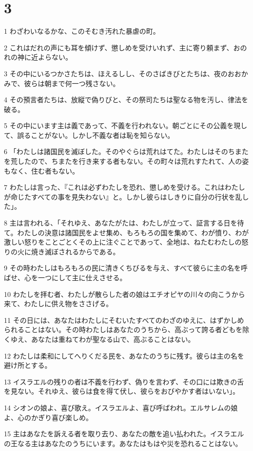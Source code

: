\chapter{3}

\par 1 わざわいなるかな、このそむき汚れた暴虐の町。
\par 2 これはだれの声にも耳を傾けず、懲しめを受けいれず、主に寄り頼まず、おのれの神に近よらない。
\par 3 その中にいるつかさたちは、ほえるしし、そのさばきびとたちは、夜のおおかみで、彼らは朝まで何一つ残さない。
\par 4 その預言者たちは、放縦で偽りびと、その祭司たちは聖なる物を汚し、律法を破る。
\par 5 その中にいます主は義であって、不義を行われない。朝ごとにその公義を現して、誤ることがない。しかし不義な者は恥を知らない。
\par 6 「わたしは諸国民を滅ぼした。そのやぐらは荒れはてた。わたしはそのちまたを荒したので、ちまたを行き来する者もない。その町々は荒れすたれて、人の姿もなく、住む者もない。
\par 7 わたしは言った、『これは必ずわたしを恐れ、懲しめを受ける。これはわたしが命じたすべての事を見失わない』と。しかし彼らはしきりに自分の行状を乱した」。
\par 8 主は言われる、「それゆえ、あなたがたは、わたしが立って、証言する日を待て。わたしの決意は諸国民をよせ集め、もろもろの国を集めて、わが憤り、わが激しい怒りをことごとくその上に注ぐことであって、全地は、ねたむわたしの怒りの火に焼き滅ぼされるからである。
\par 9 その時わたしはもろもろの民に清きくちびるを与え、すべて彼らに主の名を呼ばせ、心を一つにして主に仕えさせる。
\par 10 わたしを拝む者、わたしが散らした者の娘はエチオピヤの川々の向こうから来て、わたしに供え物をささげる。
\par 11 その日には、あなたはわたしにそむいたすべてのわざのゆえに、はずかしめられることはない。その時わたしはあなたのうちから、高ぶって誇る者どもを除くゆえ、あなたは重ねてわが聖なる山で、高ぶることはない。
\par 12 わたしは柔和にしてへりくだる民を、あなたのうちに残す。彼らは主の名を避け所とする。
\par 13 イスラエルの残りの者は不義を行わず、偽りを言わず、その口には欺きの舌を見ない。それゆえ、彼らは食を得て伏し、彼らをおびやかす者はいない」。
\par 14 シオンの娘よ、喜び歌え。イスラエルよ、喜び呼ばわれ。エルサレムの娘よ、心のかぎり喜び楽しめ。
\par 15 主はあなたを訴える者を取り去り、あなたの敵を追い払われた。イスラエルの王なる主はあなたのうちにいます。あなたはもはや災を恐れることはない。
